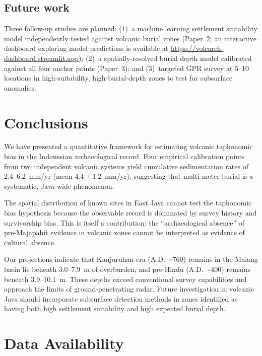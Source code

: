 \documentclass[12pt,letterpaper]{article}
\begin{document}
\subsection{Future work}

Three follow-up studies are planned: (1)~a machine learning settlement suitability model independently tested against volcanic burial zones (Paper~2; an interactive dashboard exploring model predictions is available at \url{https://volcarch-dashboard.streamlit.app}); (2)~a spatially-resolved burial depth model calibrated against all four anchor points (Paper~3); and (3)~targeted GPR survey at 5--10 locations in high-suitability, high-burial-depth zones to test for subsurface anomalies.

\section{Conclusions}

We have presented a quantitative framework for estimating volcanic taphonomic bias in the Indonesian archaeological record. Four empirical calibration points from two independent volcanic systems yield cumulative sedimentation rates of 2.4--6.2~mm/yr (mean $4.4 \pm 1.2$~mm/yr), suggesting that multi-meter burial is a systematic, Java-wide phenomenon.

The spatial distribution of known sites in East Java cannot test the taphonomic bias hypothesis because the observable record is dominated by survey history and survivorship bias. This is itself a contribution: the ``archaeological absence'' of pre-Majapahit evidence in volcanic zones cannot be interpreted as evidence of cultural absence.

Our projections indicate that Kanjuruhan-era (A.D.~\textasciitilde 760) remains in the Malang basin lie beneath 3.0--7.9~m of overburden, and pre-Hindu (A.D.~\textasciitilde 400) remains beneath 3.9--10.1~m. These depths exceed conventional survey capabilities and approach the limits of ground-penetrating radar. Future investigation in volcanic Java should incorporate subsurface detection methods in zones identified as having both high settlement suitability and high expected burial depth.

\section*{Data Availability}
\end{document}
